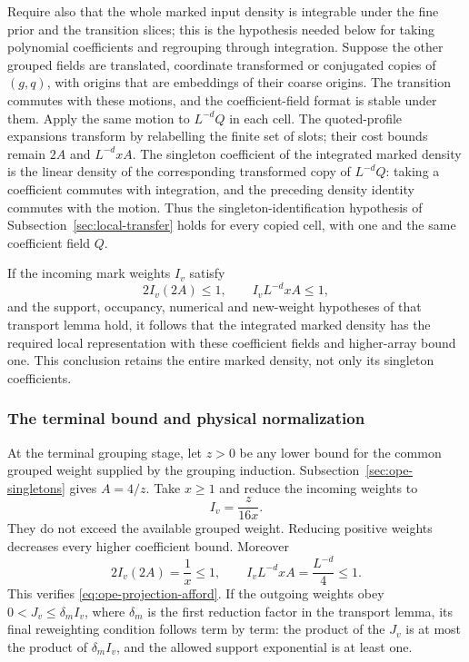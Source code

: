 Require also that the whole marked input density is integrable
under the fine prior and the transition slices; this is the
hypothesis needed below for taking polynomial coefficients and
regrouping through integration. Suppose the other grouped fields
are translated, coordinate
transformed or conjugated copies of $(g,q)$, with origins that
are embeddings of their coarse origins. The transition commutes
with these motions, and the coefficient-field format is stable
under them. Apply the same motion to $L^{-d}Q$ in each cell.
The quoted-profile expansions transform by relabelling the finite
set of slots; their cost bounds remain $2A$ and $L^{-d}xA$.
The singleton coefficient of the integrated marked density is
the linear density of the corresponding transformed copy of
$L^{-d}Q$: taking a coefficient commutes with integration, and
the preceding density identity commutes with the motion. Thus
the singleton-identification hypothesis of
Subsection~\ref{sec:local-transfer} holds for every copied cell,
with one and the same coefficient field $Q$.

If the incoming mark weights $I_v$ satisfy
\begin{equation}\label{eq:ope-projection-afford}
                 2I_v(2A)\le1,\qquad
                 I_vL^{-d}xA\le1,
\end{equation}
and the support, occupancy, numerical and new-weight hypotheses
of that transport lemma hold, it follows that the integrated
marked density has the required local representation with these
coefficient fields and higher-array bound one. This conclusion
retains the entire marked density, not only its singleton
coefficients.

\subsubsection{The terminal bound and physical normalization}
At the terminal grouping stage, let $z>0$ be any lower bound
for the common grouped weight supplied by the grouping induction.
Subsection~\ref{sec:ope-singletons} gives $A=4/z$. Take $x\ge1$ and
reduce the incoming weights to
\[
                             I_v=\frac{z}{16x}.
\]
They do not exceed the available grouped weight. Reducing positive
weights decreases every higher coefficient bound. Moreover
\[
       2I_v(2A)=\frac1x\le1,
       \qquad I_vL^{-d}xA=\frac{L^{-d}}4\le1.
\]
This verifies \eqref{eq:ope-projection-afford}. If the outgoing
weights obey $0<J_v\le\delta_m I_v$, where $\delta_m$ is the
first reduction factor in the transport lemma, its final
reweighting condition follows term by term: the product of the
$J_v$ is at most the product of $\delta_m I_v$, and the allowed
support exponential is at least one.

